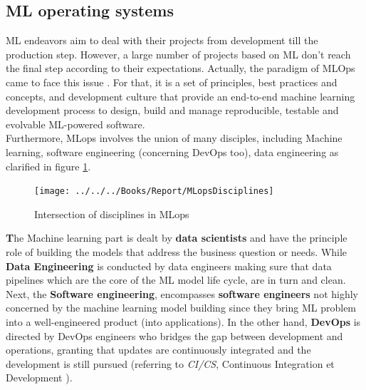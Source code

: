 \documentclass[12pt,a4paper, oneside]{book}
\begin{document}
\subsection{\large  ML operating systems} 
ML endeavors aim to deal with their projects from development till the production step. However, a large number of projects based on ML don't reach the final step according to their expectations. Actually, the paradigm of MLOps came to face this issue \cite{kreuzberger2023machine}. For that, it is a set of principles, best practices and concepts, and development culture that provide an end-to-end machine learning development process to design, build and manage reproducible, testable and evolvable ML-powered software. \\

Furthermore, MLops involves the union of many disciples, including Machine learning, software engineering (concerning DevOps too), data engineering as clarified in figure \ref{fig:mlopsdisciplines}.
\begin{figure}[h!]
	\centering
	\texttt{[image: ../../../Books/Report/MLopsDisciplines]}
	\caption{Intersection of disciplines in MLops}
	\label{fig:mlopsdisciplines}
\end{figure} 

\textbf The {Machine learning part} is dealt by \textbf{data scientists} and have the principle role of building the models that address the business question or needs. While \textbf{Data Engineering} is conducted by data engineers making sure that data pipelines which are the core of the ML model life cycle, are in turn and clean. Next, the \textbf{Software engineering}, encompasses \textbf{software engineers} not highly concerned by the machine learning model building since they bring ML problem into a well-engineered product (into applications). 
In the other hand, \textbf{DevOps} is directed by DevOps engineers who bridges the gap between development and operations, granting that updates are continuously integrated and the development is still pursued (referring to \textit{CI/CS}, Continuous Integration et Development ). \\
\end{document}
